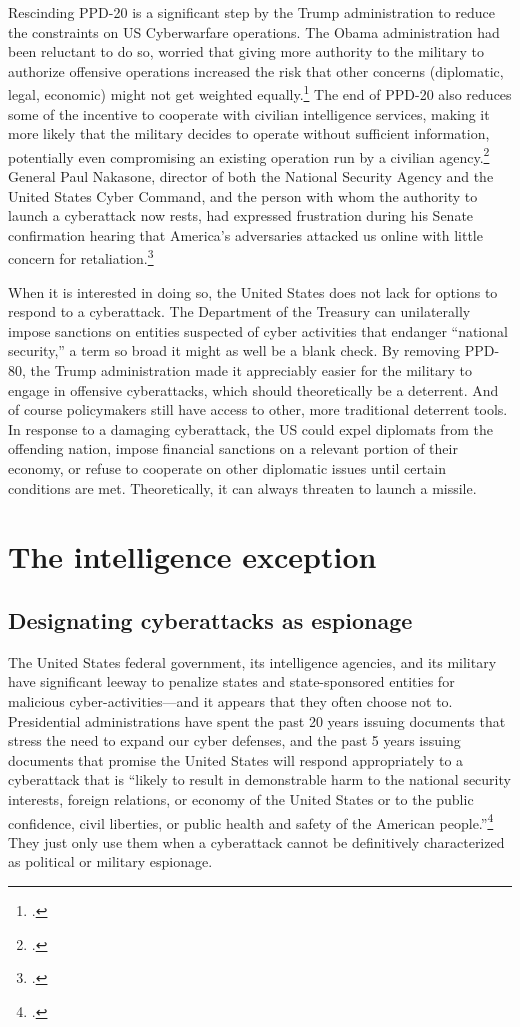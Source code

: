 \documentclass{memoir}
\begin{document}
\begin{refsegment}
Rescinding PPD-20 is a significant step by the Trump administration to reduce the constraints on US Cyberwarfare operations. The Obama administration had been reluctant to do so, worried that giving more authority to the military to authorize offensive operations increased the risk that other concerns (diplomatic, legal, economic) might not get weighted equally.\footcite{starks_ramifications_2018} The end of PPD-20 also reduces some of the incentive to cooperate with civilian intelligence services, making it more likely that the military decides to operate without sufficient information, potentially even compromising an existing operation run by a civilian agency.\footcite{hawkins_cybersecurity_2018} General Paul Nakasone, director of both the National Security Agency and the United States Cyber Command, and the person with whom the authority to launch a cyberattack now rests, had expressed frustration during his Senate confirmation hearing that America's adversaries attacked us online with little concern for retaliation.\footcite{sanger_trump_2018}

When it is interested in doing so, the United States does not lack for options to respond to a cyberattack. The Department of the Treasury can unilaterally impose sanctions on entities suspected of cyber activities that endanger ``national security,'' a term so broad it might as well be a blank check. By removing PPD-80, the Trump administration made it appreciably easier for the military to engage in offensive cyberattacks, which should theoretically be a deterrent. And of course policymakers still have access to other, more traditional deterrent tools. In response to a damaging cyberattack, the US could expel diplomats from the offending nation, impose financial sanctions on a relevant portion of their economy, or refuse to cooperate on other diplomatic issues until certain conditions are met. Theoretically, it can always threaten to launch a missile.

\section{The intelligence exception}
\subsection{Designating cyberattacks as espionage}
The United States federal government, its intelligence agencies, and its military have significant leeway to penalize states and state-sponsored entities for malicious cyber-activities---and it appears that they often choose not to. Presidential administrations have spent the past 20 years issuing documents that stress the need to expand our cyber defenses, and the past 5 years issuing documents that promise the United States will respond appropriately to a cyberattack that is ``likely to result in demonstrable harm to the national security interests, foreign relations, or economy of the United States or to the public confidence, civil liberties, or public health and safety of the American people.''\footcite{office_of_the_press_secretary_fact_2016} They just only use them when a cyberattack cannot be definitively characterized as political or military espionage.


\end{refsegment}
\end{document}
